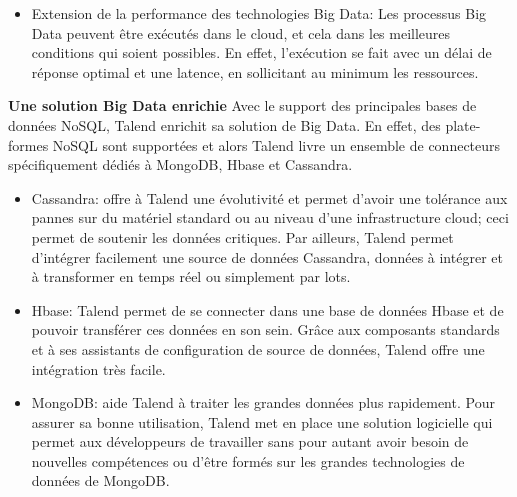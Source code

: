 \documentclass[12pt,a4wide,twoside]{report}
\begin{document}
\begin{itemize}
		\item Extension de la performance des technologies Big Data: \newline
		 Les processus Big Data peuvent être exécutés dans le cloud, et cela dans les meilleures conditions qui soient possibles. En effet, l'exécution se fait avec un délai de réponse optimal et une latence, en sollicitant au minimum les ressources. \newline
\end{itemize}


 \textbf{Une solution Big Data enrichie \newline}
 Avec le support des principales bases de données NoSQL, Talend enrichit sa solution de Big Data. En effet, des plate-formes NoSQL sont supportées et alors Talend livre un ensemble de connecteurs spécifiquement dédiés à MongoDB, Hbase et Cassandra.\newline 
 \begin{itemize}
 	\item Cassandra: offre à Talend une évolutivité et permet d'avoir une tolérance aux pannes sur du matériel standard ou au niveau d'une infrastructure cloud; ceci permet de soutenir les données critiques.\newline
 	Par ailleurs, Talend permet d'intégrer facilement une source de données Cassandra, données à intégrer et à transformer en temps réel ou simplement par lots.\newline
 	
 	\item Hbase: Talend permet de se connecter dans une base de données Hbase et de pouvoir transférer ces données en son sein. Grâce aux composants standards et à ses assistants de configuration de source de données, Talend offre une intégration très facile. \newline
 	
 	\item MongoDB: aide Talend à traiter les grandes données plus rapidement.\newline 
 	Pour assurer sa bonne utilisation, Talend met en place une solution logicielle qui permet aux développeurs de travailler sans pour autant avoir besoin de nouvelles compétences ou d'être formés sur les grandes technologies de données de MongoDB. 	 	
 \end{itemize}
 
\end{document}
